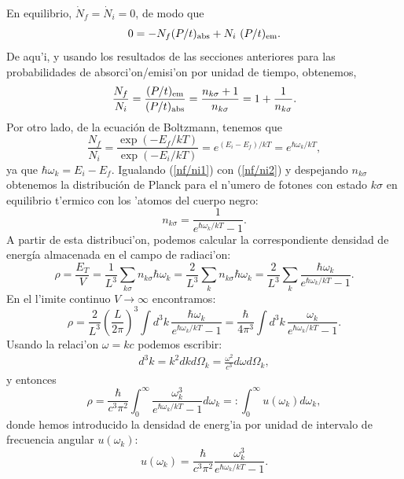 En equilibrio, $ \dot N_f = \dot N_i =0$,  de modo que
\begin{equation}
 0 = - N_f (P/t)_{\rm abs}+ N_i \ (P/t)_{\rm em} .
\end{equation} 
De aqu'i, y usando los resultados de las secciones anteriores para
las probabilidades de absorci'on/emisi'on por unidad de tiempo, obtenemos, 
\begin{equation}
 \frac{N_f}{N_i}= \frac{(P/t)_{\rm em}}{(P/t)_{\rm abs}}=\frac{n_{k
\sigma}+1}{n_{k\sigma}}= 1+ \frac{1}{n_{k \sigma}}. \label{nf/ni1}
\end{equation} 
Por otro lado, de la ecuaci\'on de Boltzmann, tenemos que 
\begin{equation}
\frac{N_f}{N_i}=\frac{\exp(-E_f/k T)}{\exp(-E_i/k
T)}=e^{(E_i-E_f)/kT}=e^{\hbar \omega_k /kT},\label{nf/ni2}
\end{equation}
ya que $\hbar\omega_k = E_i-E_f$. Igualando (\ref{nf/ni1}) con
(\ref{nf/ni2}) y despejando $n_{k\sigma}$ obtenemos la distribuci\'on de
Planck para el n'umero de fotones con estado $k\sigma$ en equilibrio t'ermico
con los 'atomos del cuerpo negro:
\begin{equation}
n_{k \sigma}= \frac{1}{e^{\hbar \omega _k /kT}-1}.
\end{equation}
A partir de esta distribuci'on, podemos calcular la correspondiente densidad de
energ\'ia almacenada en el campo de radiaci'on:
\begin{equation}
\rho = \frac{E_T}{V}= \frac{1}{L^3} \sum _{k \sigma} n_{k \sigma} \hbar \omega
_k =\frac{2}{L^3} \sum _{k } n_{k \sigma} \hbar \omega _k = \frac{2}{L^3} \sum
_{k } \frac{\hbar \omega _k }{e^{\hbar \omega _k / k T} -1} .
\end{equation}
En el l'imite continuo $V\rightarrow\infty$ encontramos:
\begin{equation}
\rho= \frac{2}{L^3} \left( \frac{L}{2 \pi} \right)^3 \int d ^3 k\,
\frac{\hbar\omega_k}{e^{\hbar \omega _k / k T} -1}= \frac{\hbar}{4
\pi ^3} \int d ^3k\, \frac{\omega _k}{e^{\hbar \omega _k / k T}-1}.
\end{equation} 
Usando la relaci'on $\omega =kc$  podemos escribir:
\begin{eqnarray*}
d^3 k = k^2 d k  d \Omega _k = \frac{\omega ^2}{c^3} d \omega d \Omega _k,
\end{eqnarray*}
y entonces 
\begin{equation}
\rho %
=\frac{\hbar}{c^3 \pi ^2} \int_0^\infty\frac{\omega^3_k}{e^{\hbar \omega _k / k
T}-1}d \omega _k =: \int_0^\infty u (\omega _k ) d \omega _k,
\end{equation}
donde hemos introducido la densidad de energ'ia por unidad de intervalo de
frecuencia angular $u(\omega_k)$:
\begin{equation}
u(\omega _k)=\frac{\hbar}{c^3 \pi ^2} \frac{\omega
_k^3}{e^{\hbar\omega_k/kT}-1}.
\end{equation}

